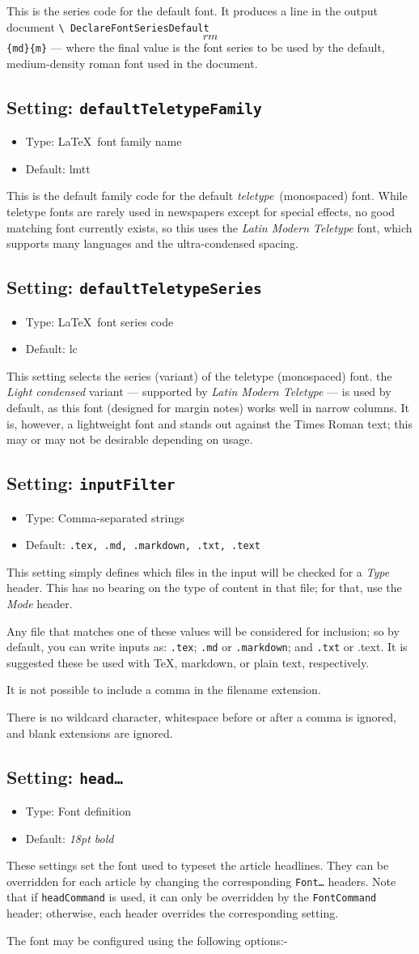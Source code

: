 \documentclass[a4paper,DIV=11]{scrartcl}
\newcommand{\property}[5]{
  \subsection{#1: \texttt{#2}}
  \begin{itemize}
  \item Type: #3
  \item Default: #4
  \end{itemize}
  #5
}
\newcommand{\setting}{\property{Setting}}
\begin{document}
\begin{multicols}{2}
{  This is the series code for the default font. It produces a line in
  the output document \texttt{\textbackslash
    DeclareFontSeriesDefault\[rm\]\{md\}\{m\}} --- where the final
  value is the font series to be used by the default, medium-density
  roman font used in the document.
}
\setting{defaultTeletypeFamily}{\LaTeX\ font family name}{lmtt}{
  This is the default family code for the default
  \textit{teletype}~(monospaced) font. While teletype fonts are rarely
  used in newspapers except for special effects, no good matching
  font currently exists, so this uses the \textit{Latin Modern
    Teletype} font, which supports many languages and the
  ultra-condensed spacing.
}
\setting{defaultTeletypeSeries}{\LaTeX\ font series code}{lc}{
  This setting selects the series (variant) of the teletype
  (monospaced) font. the \textit{Light condensed} variant ---
  supported by \textit{Latin Modern Teletype} --- is used by default,
  as this font (designed for margin notes) works well in narrow
  columns. It is, however, a lightweight font and stands out against
  the Times Roman text; this may or may not be desirable depending on
  usage.
}
\setting{inputFilter}{Comma-separated strings}{\texttt{.tex, .md, .markdown, .txt, .text}}{
  This setting simply defines which files in the input will be checked
  for a \textit{Type} header. This has no bearing on the type of
  content in that file; for that, use the \textit{Mode} header.\par
  Any file that matches one of these values will be considered for
  inclusion; so by default, you can write inputs as: \texttt{.tex};
  \texttt{.md} or \texttt{.markdown}; and \texttt{.txt} or {.text}. It
  is suggested these be used with \TeX, markdown, or plain text, respectively.\par
  It is not possible to include a comma in the filename extension.\par
  There is no wildcard character, whitespace before or after a comma
  is ignored, and blank extensions are ignored.
}
\setting{head\dots}{Font definition}{\textit{18pt bold}}{
  These settings set the font used to typeset the article headlines. They can
  be overridden for each article by changing the corresponding
  \texttt{Font\dots} headers. Note that if \texttt{headCommand} is
  used, it can only be overridden by the \texttt{FontCommand} header;
  otherwise, each header overrides the corresponding setting.
  \par
  The font may be configured using the following options:-\par
}
\end{multicols}
\end{document}
